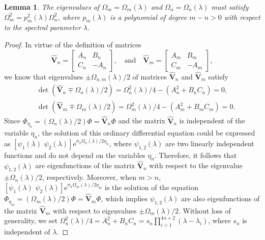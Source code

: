 \documentclass[11pt,reqno]{amsart}
\newcommand{\ee}{\mathrm{e}}
\newtheorem{lemma}{Lemma}
\numberwithin{equation}{section}
\begin{document}
\begin{proof-kerin}
\begin{lemma}
		The eigenvalues of $\Omega_m=\Omega_m(\lambda)$ and $\Omega_n=\Omega_n(\lambda)$ must satisfy $\Omega_m^2=p_m^2(\lambda)\Omega_n^2$, where $p_m(\lambda)$ is a polynomial of degree $m-n>0$ with respect to the spectral parameter $\lambda$.
	\end{lemma}
	\begin{proof}
		In virtue of the definition of matrices 
		\begin{equation}\nonumber
			\hat{\mathbf{V}}_{n}=\begin{bmatrix}
				A_n & B_n \\ C_n & -A_n
			\end{bmatrix}, \quad \text{and} \quad
			\hat{\mathbf{V}}_{m}=\begin{bmatrix}
				A_m & B_m \\ C_m & -A_m
			\end{bmatrix},
		\end{equation}
		we know that eigenvalues $\pm\Omega_{n,m}(\lambda)/2$ of matrices $\hat{\mathbf{V}}_{n}$ and $\hat{\mathbf{V}}_{m}$ satisfy
		\begin{equation}\label{eq:eigenvalue}\nonumber
			\begin{split}
					&\ \det(\hat{\mathbf{V}}_n\mp \Omega_n(\lambda)/2)=\Omega_n^2(\lambda)/4-(A_n^2+B_nC_n)=0, \\
				&\ \det(\hat{\mathbf{V}}_m\mp \Omega_m(\lambda)/2)=\Omega_m^2(\lambda)/4-(A_m^2+B_mC_m)=0.
			\end{split}
		\end{equation}
		Since $\Phi_{\eta_n}=(\Omega_{n}(\lambda)/2)\Phi=\hat{\mathbf{V}}_n\Phi$ and the matrix $\hat{\mathbf{V}}_n$ is independent of the variable $\eta_n$, the solution of this ordinary differential equation could be expressed as $[\psi_1(\lambda) \,\, \psi_2(\lambda)]\ee^{\sigma_3\Omega_{n}(\lambda)/2\eta_n}$, where $\psi_{1,2}(\lambda)$ are two linearly independent functions and do not depend on the variables $\eta_n$.
		Therefore, it follows that $\psi_{1,2}(\lambda)$ are eigenfunctions of the matrix $\hat{\mathbf{V}}_n$ with respect to the eigenvalue $\pm\Omega_{n}(\lambda)/2$, respectively.
		Moreover, when $m>n$, $[\psi_1(\lambda) \,\, \psi_2(\lambda)]\ee^{\sigma_3\Omega_{m}(\lambda)/2\eta_m}$ is the solution of the equation  $\Phi_{\eta_m}=(\Omega_{m}(\lambda)/2)\Phi=\hat{\mathbf{V}}_m\Phi$, which implies $\psi_{1,2}(\lambda)$ are also eigenfunctions of the matrix $\hat{\mathbf{V}}_m$ with respect to eigenvalues $\pm\Omega_{m}(\lambda)/2$.
		Without loss of generality,	we set $\Omega_n^2(\lambda)/4=A_n^2+B_nC_n=s_n\prod_{i=1}^{4n+2} (\lambda-\lambda_i)$, where $s_n$ is independent of $\lambda$. 

\end{proof}
\end{proof-kerin}
\end{document}
